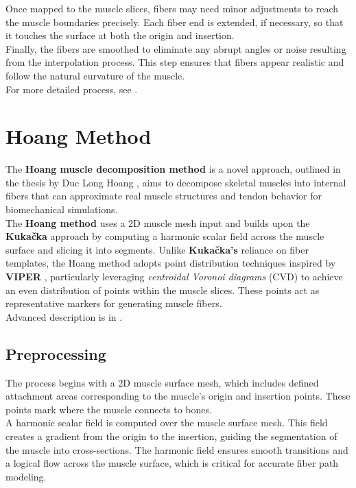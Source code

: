 \documentclass[english, bc, kiv, he, iso690alph, pdf, viewonly]{fasthesis}
\begin{document}
Once mapped to the muscle slices, fibers may need minor adjustments to reach the muscle boundaries precisely. Each fiber end is extended, if necessary, so that it touches the surface at both the origin and insertion. \\

Finally, the fibers are smoothed to eliminate any abrupt angles or noise resulting from the interpolation process. This step ensures that fibers appear realistic and follow the natural curvature of the muscle. \\

For more detailed process, see \cite{KK14}.

\newpage
\section{Hoang Method}

The \textbf{Hoang muscle decomposition method} is a novel approach, outlined in the thesis by Duc Long Hoang \cite{HOA23}, aims to decompose skeletal muscles into internal fibers that can approximate real muscle structures and tendon behavior for biomechanical simulations. \\

The \textbf{Hoang method} uses a 2D muscle mesh input and builds upon the \textbf{Kukačka} approach by computing a harmonic scalar field across the muscle surface and slicing it into segments. Unlike \textbf{Kukačka's}  reliance on fiber templates, the Hoang method adopts point distribution techniques inspired by \textbf{VIPER} \cite{Ang+19}, particularly leveraging \textsl{centroidal Voronoi diagrams} (CVD) to achieve an even distribution of points within the muscle slices. These points act as representative markers for generating muscle fibers. \\
Advanced description is in \cite{HOA23}.

\subsection{Preprocessing}

The process begins with a 2D muscle surface mesh, which includes defined attachment areas corresponding to the muscle's origin and insertion points. These points mark where the muscle connects to bones. \\

A harmonic scalar field is computed over the muscle surface mesh. This field creates a gradient from the origin to the insertion, guiding the segmentation of the muscle into cross-sections. The harmonic field ensures smooth transitions and a logical flow across the muscle surface, which is critical for accurate fiber path modeling. \\
\end{document}

